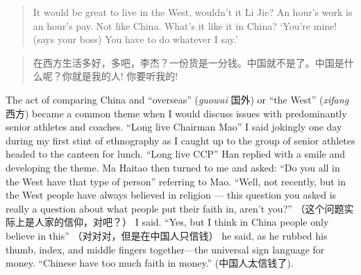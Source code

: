   \begin{quotation}
    It would be great to live in the West, wouldn’t it Li Jie?  An hour’s work is an hour’s pay.  Not like China.  What’s it like it in China?  `You’re mine! (says your boss) You have to do whatever I say.'
  \end{quotation}

  \begin{quotation}
    在西方生活多好，多吧，李杰？一份货是一分钱。中国就不是了。中国是什么呢？你就是我的人! 你要听我的!
  \end{quotation}

  The act of comparing China and ``overseas'' (\textit{guowai} 国外) or ``the West'' (\textit{xifang} 西方) became a common theme when I would discuss issues with predominantly senior athletes and coaches.
  ``Long live Chairman Mao'' I said jokingly one day during my first stint of ethnography as I caught up to the group of senior athletes headed to the canteen for lunch.  ``Long live CCP'' Han replied with a smile and developing the theme.  Ma Haitao then turned to me and asked: ``Do you all in the West have that type of person'' referring to Mao.  ``Well, not recently, but in the West people have always believed in religion --- this question you asked is really a question about what people put their faith in, aren't you?'' （这个问题实际上是人家的信仰，对吧？） I said.  ``Yes, but I think in China people only believe in this'' （对对对，但是在中国人只信钱） he said, as he rubbed his thumb, index, and middle fingers together---the universal sign language for money. ``Chinese have too much faith in money.'' (中国人太信钱了).

